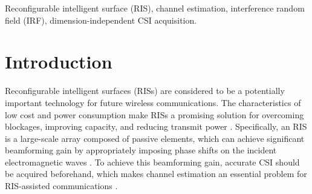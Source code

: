 \documentclass[conference,10pt,twocolumn]{IEEEtran}
\theoremstyle{nonumberplain}
\begin{document}
\begin{abstract}
Reconfigurable intelligent surfaces (RISs) are envisioned as a potentially transformative technology for future wireless communications.
However, RIS's inability to process signals and their attendant increased channel dimension have brought new challenges to RIS-assisted systems, which greatly increases the pilot overhead required for channel estimation.
In this paper, we propose a dimension-independent channel state information (CSI) acquisition approach in which the required pilot overhead is independent of the number of RIS elements.
In order to achieve this dimension-independent property, we propose a novel signaling method in which signals are transmitted from the base station (BS) and the user simultaneously during CSI acquisition.
Under this method, an electromagnetic interference random field (IRF) will be induced on the RIS, and we employ a sensing RIS to capture its features.
Moreover, we develop two algorithms for parameter estimation in this system, and also derive the Cram{\'e}r-Rao lower bound (CRLB) and an asymptotic expression for it. 
Simulation results verify that our proposed signal transmission method and the corresponding algorithms can achieve dimension-independent CSI acquisition for beamforming.
\end{abstract}

\begin{IEEEkeywords}
Reconfigurable intelligent surface (RIS), channel estimation, interference random field (IRF), dimension-independent CSI acquisition. 
\end{IEEEkeywords}

\section{Introduction}
Reconfigurable intelligent surfaces (RISs) are considered to be a potentially important technology for future wireless communications.
The characteristics of low cost and power consumption make RISs a promising solution for overcoming blockages, improving capacity, and reducing transmit power \cite{basar2019wireless,liu2021compact,wu2019intelligent}.
Specifically, an RIS is a large-scale array composed of passive elements, which can achieve significant beamforming gain by appropriately imposing phase shifts on the incident electromagnetic waves \cite{di2020smart}.
To achieve this beamforming gain, accurate \ac{CSI} should be acquired beforehand, which makes channel estimation an essential problem for RIS-assisted communications \cite{wei2021channel}.
\end{document}
